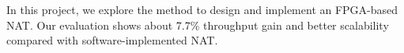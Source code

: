 
In this project, we explore the method to design and implement an FPGA-based NAT. Our evaluation shows about 7.7\% throughput gain and better scalability compared with software-implemented NAT.